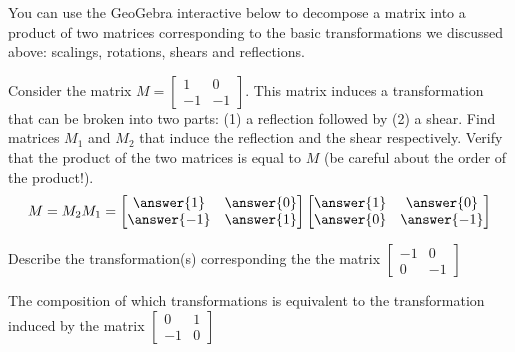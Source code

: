 \documentclass{ximera}
\begin{document}
\begin{exploration}\label{exp:matrixComp}
You can use the GeoGebra interactive below to decompose a matrix into a product of two matrices corresponding to the basic transformations we discussed above: scalings, rotations, shears and reflections.

Consider the matrix $M=\begin{bmatrix} 1 & 0\\-1 & -1\end{bmatrix}$.  This matrix induces a transformation that can be broken into two parts: (1) a reflection followed by (2) a shear.  Find matrices $M_1$ and $M_2$ that induce the reflection and the shear respectively.  Verify that the product of the two matrices is equal to $M$ (be careful about the order of the product!).
$$M=M_2M_1=\begin{bmatrix}\answer{1}&\answer{0}\\\answer{-1}&\answer{1}\end{bmatrix}\begin{bmatrix}\answer{1}&\answer{0}\\\answer{0}&\answer{-1}\end{bmatrix}$$
\begin{center}
\end{center}
Describe the transformation(s) corresponding the the matrix $\begin{bmatrix}-1&0\\0&-1\end{bmatrix}$
\begin{multipleChoice}  
\end{multipleChoice} 

The composition of which transformations is equivalent to the transformation induced by the matrix $\begin{bmatrix}0&1\\-1&0\end{bmatrix}$
\begin{multipleChoice}  
\end{multipleChoice} 
\end{exploration}
\end{document}
